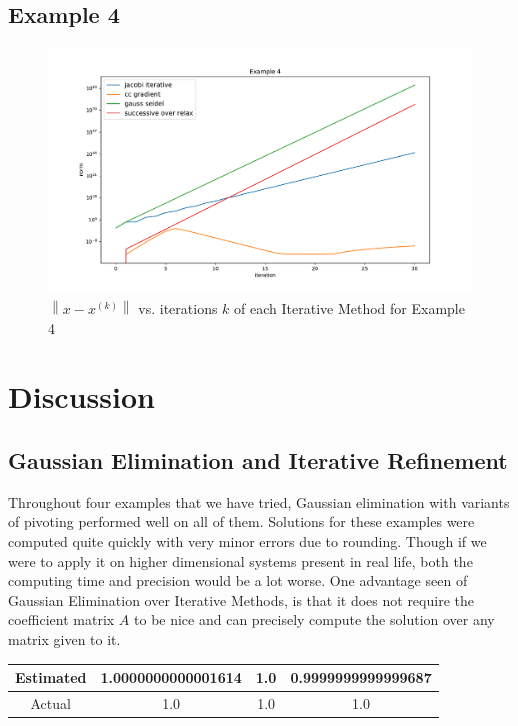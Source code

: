 \documentclass[11pt]{article}	%
\newcommand\norm[1]{\left\lVert#1\right\rVert}
\begin{document}
\subsection{Example 4}
\begin{figure}[H]
\centering
\includegraphics[width=.9\textwidth]{4}
\caption{$\norm{x - x^{(k)}}$ vs. iterations $k$ of each Iterative Method for Example 4}
\label{fig:rk4_predictor_ab4_1}
\end{figure}

\section{Discussion}
\subsection{Gaussian Elimination and Iterative Refinement}
Throughout four examples that we have tried, Gaussian elimination with variants of pivoting performed well on all of them. Solutions for these examples were computed quite quickly with very minor errors due to rounding. Though if we were to apply it on higher dimensional systems present in real life, both the computing time and precision would be a lot worse. One advantage seen of Gaussian Elimination over Iterative Methods, is that it does not require the coefficient matrix $A$ to be nice and can precisely compute the solution over any matrix given to it.

\begin{center}
	 \label{tab:title}
    \begin{tabular}{||c|c|c|c||}
        \hline
        Estimated & 1.0000000000001614 & 1.0 &  0.9999999999999687 \\ [.25em]
        \hline\hline
        Actual & 1.0 & 1.0 & 1.0 \\ [.25em]
        \hline
    \end{tabular}
\end{center}
\end{document}
